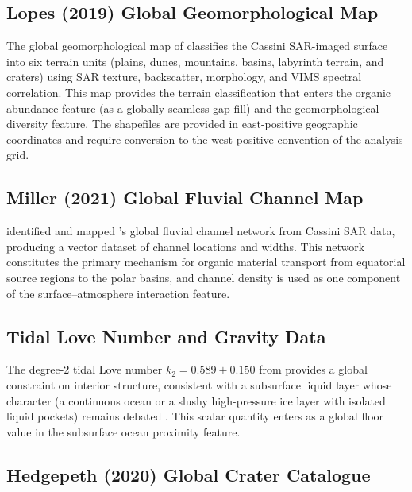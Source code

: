 \subsection{Lopes (2019) Global Geomorphological Map}
\label{sec:geo_data}

The global geomorphological map of \citet{Lopes2019} classifies the Cassini
SAR-imaged surface into six terrain units (plains, dunes, mountains, basins,
labyrinth terrain, and craters) using SAR texture, backscatter,
morphology, and VIMS spectral correlation.  This map provides the terrain
classification that enters the organic abundance feature (as a globally
seamless gap-fill) and the geomorphological diversity feature.  The shapefiles
are provided in east-positive geographic coordinates and require conversion to
the west-positive convention of the analysis grid.

\subsection{Miller (2021) Global Fluvial Channel Map}
\label{sec:channel_data}

\citet{Miller2021channels} identified and mapped \titan{}'s global fluvial
channel network from Cassini SAR data, producing a vector dataset of channel
locations and widths.  This network constitutes the primary mechanism for
organic material transport from equatorial source regions to the polar basins,
and channel density is used as one component of the surface--atmosphere
interaction feature.

\subsection{Tidal Love Number and Gravity Data}
\label{sec:gravity_data}

The degree-2 tidal Love number $k_2 = 0.589 \pm 0.150$ from \citet{Iess2012}
provides a global constraint on interior structure, consistent with a
subsurface liquid layer whose character (a continuous ocean or a slushy
high-pressure ice layer with isolated liquid pockets) remains debated
\citep{Petricca2025}.  This scalar quantity enters as a global floor
value in the subsurface ocean proximity feature.

\subsection{Hedgepeth (2020) Global Crater Catalogue}
\label{sec:crater_data}

